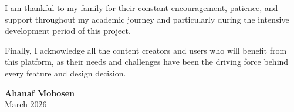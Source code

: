 I am thankful to my family for their constant encouragement, patience, and support throughout my academic journey and particularly during the intensive development period of this project.

\vspace{0.5cm}

Finally, I acknowledge all the content creators and users who will benefit from this platform, as their needs and challenges have been the driving force behind every feature and design decision.

\vspace{2cm}

\begin{flushright}
\textbf{Ahanaf Mohosen}\\
March 2026
\end{flushright}
